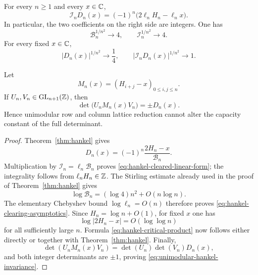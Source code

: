 \begin{proposition}
\label{prop:hankel-integral-saturation}
For every \(n\geq1\) and every \(x\in\mathbb C\),
\begin{equation}\label{eq:hankel-cleared-linear-form}
 \mathcal I_nD_n(x)
 =(-1)^n\bigl(2\ell_nH_n-\ell_nx\bigr).
\end{equation}
In particular, the two coefficients on the right side are integers.  One
has
\begin{equation}\label{eq:hankel-clearing-asymptotics}
 \mathcal B_n^{1/n^2}\longrightarrow4,
 \qquad
 \mathcal I_n^{1/n^2}\longrightarrow4.
\end{equation}
For every fixed \(x\in\mathbb C\),
\begin{equation}\label{eq:hankel-critical-product}
 |D_n(x)|^{1/n^2}\longrightarrow\frac14,
 \qquad
 \boxed{
 |\mathcal I_nD_n(x)|^{1/n^2}\longrightarrow1.}
\end{equation}

Let
\[
 M_n(x)=(H_{i+j}-x)_{0\leq i,j\leq n}.
\]
If \(U_n,V_n\in\operatorname{GL}_{n+1}(\mathbb Z)\), then
\begin{equation}\label{eq:unimodular-hankel-invariance}
 \det\bigl(U_nM_n(x)V_n\bigr)=\pm D_n(x).
\end{equation}
Hence unimodular row and column lattice reduction cannot alter the
capacity constant of the full determinant.
\end{proposition}

\begin{proof}
Theorem~\ref{thm:hankel} gives
\[
 D_n(x)=(-1)^n\frac{2H_n-x}{\mathcal B_n}.
\]
Multiplication by \(\mathcal I_n=\ell_n\mathcal B_n\) proves
\eqref{eq:hankel-cleared-linear-form}; the integrality follows from
\(\ell_nH_n\in\mathbb Z\).  The Stirling estimate already used in the proof of
Theorem~\ref{thm:hankel} gives
\[
 \log\mathcal B_n=(\log4)n^2+O(n\log n).
\]
The elementary Chebyshev bound \(\log\ell_n=O(n)\) therefore proves
\eqref{eq:hankel-clearing-asymptotics}.  Since
\(H_n=\log n+O(1)\), for fixed \(x\) one has
\[
 \log|2H_n-x|=O(\log\log n)
\]
for all sufficiently large \(n\).  Formula
\eqref{eq:hankel-critical-product} now follows either directly or together
with Theorem~\ref{thm:hankel}.  Finally,
\[
 \det(U_nM_n(x)V_n)=\det(U_n)\det(V_n)D_n(x),
\]
and both integer determinants are \(\pm1\), proving
\eqref{eq:unimodular-hankel-invariance}.
\end{proof}

